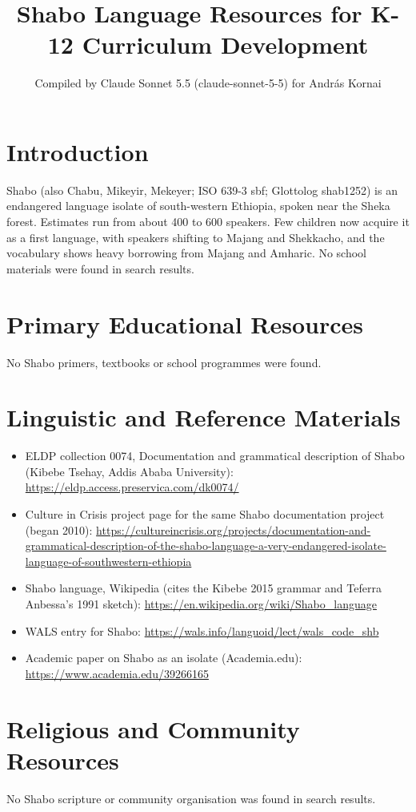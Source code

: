 \documentclass[12pt]{article}
\title{Shabo Language Resources for K-12 Curriculum Development}
\author{Compiled by Claude Sonnet 5.5 (claude-sonnet-5-5) for Andr\'as Kornai}
\date{}
\begin{document}
\maketitle

\section{Introduction}
Shabo (also Chabu, Mikeyir, Mekeyer; ISO 639-3 sbf; Glottolog shab1252) is an endangered language isolate of south-western Ethiopia, spoken near the Sheka forest. Estimates run from about 400 to 600 speakers. Few children now acquire it as a first language, with speakers shifting to Majang and Shekkacho, and the vocabulary shows heavy borrowing from Majang and Amharic. No school materials were found in search results.

\section{Primary Educational Resources}
No Shabo primers, textbooks or school programmes were found.

\section{Linguistic and Reference Materials}
\begin{itemize}
\item ELDP collection 0074, Documentation and grammatical description of Shabo (Kibebe Tsehay, Addis Ababa University): \url{https://eldp.access.preservica.com/dk0074/}
\item Culture in Crisis project page for the same Shabo documentation project (began 2010): \url{https://cultureincrisis.org/projects/documentation-and-grammatical-description-of-the-shabo-language-a-very-endangered-isolate-language-of-southwestern-ethiopia}
\item Shabo language, Wikipedia (cites the Kibebe 2015 grammar and Teferra Anbessa's 1991 sketch): \url{https://en.wikipedia.org/wiki/Shabo_language}
\item WALS entry for Shabo: \url{https://wals.info/languoid/lect/wals_code_shb}
\item Academic paper on Shabo as an isolate (Academia.edu): \url{https://www.academia.edu/39266165}
\end{itemize}

\section{Religious and Community Resources}
No Shabo scripture or community organisation was found in search results.
\end{document}
